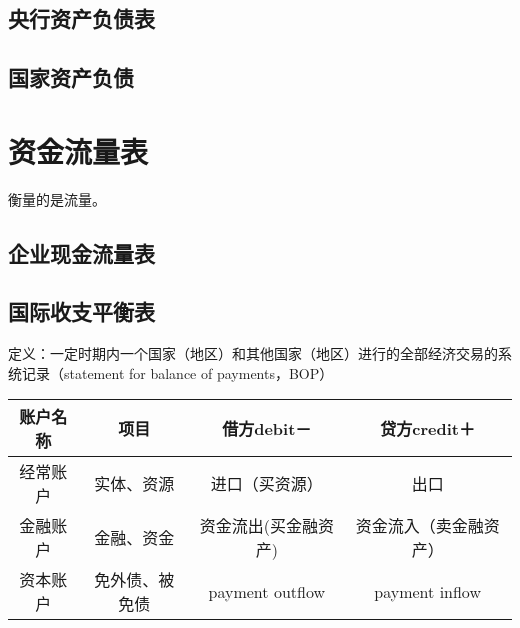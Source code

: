 \documentclass[12pt]{book}
\begin{document}
\section{央行资产负债表}

\section{国家资产负债}












\chapter{资金流量表}

衡量的是流量。




\section{企业现金流量表}



\section{国际收支平衡表}


定义：一定时期内一个国家（地区）和其他国家（地区）进行的全部经济交易的系统记录（statement for balance of payments，BOP）


\begin{tabu}{|c|c|c|c|}
    \hline
    账户名称 & 项目           & 借方debit－          & 贷方credit＋           \\\hline
    经常账户 & 实体、资源     & 进口（买资源）       & 出口                   \\\hline
    金融账户 & 金融、资金     & 资金流出(买金融资产) & 资金流入（卖金融资产） \\\hline
    资本账户 & 免外债、被免债 & payment outflow      & payment inflow         \\\hline
\end{tabu}
\end{document}
